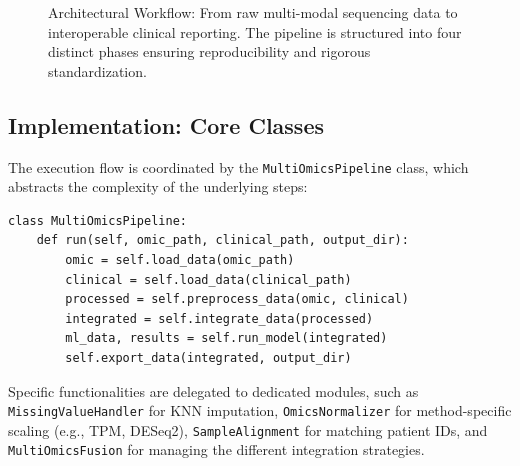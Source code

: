 \documentclass[sigconf,nonacm]{acmart}
\begin{document}
\begin{figure}[ht]
\caption{Architectural Workflow: From raw multi-modal sequencing data to interoperable clinical reporting. The pipeline is structured into four distinct phases ensuring reproducibility and rigorous standardization.}\label{fig:pipeline_dag}
\end{figure}

\subsection{Implementation: Core Classes}
The execution flow is coordinated by the \texttt{MultiOmicsPipeline} class, which abstracts the complexity of the underlying steps:

\begin{lstlisting}[caption={Simplified pipeline orchestration snippet.}]
class MultiOmicsPipeline:
    def run(self, omic_path, clinical_path, output_dir):
        omic = self.load_data(omic_path)
        clinical = self.load_data(clinical_path)
        processed = self.preprocess_data(omic, clinical)
        integrated = self.integrate_data(processed)
        ml_data, results = self.run_model(integrated)
        self.export_data(integrated, output_dir)
\end{lstlisting}

Specific functionalities are delegated to dedicated modules, such as \texttt{MissingValueHandler} for KNN imputation, \texttt{OmicsNormalizer} for method-specific scaling (e.g., TPM, DESeq2), \texttt{SampleAlignment} for matching patient IDs, and \texttt{MultiOmicsFusion} for managing the different integration strategies.
\end{document}
